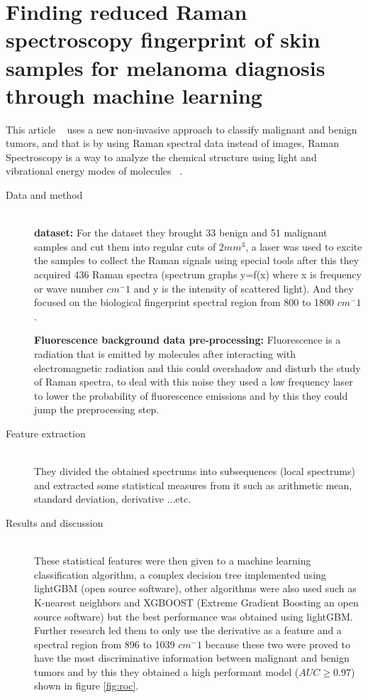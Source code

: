 
\section{Finding reduced Raman spectroscopy fingerprint of skin samples for melanoma diagnosis through machine learning}
    This article ~\cite{Daniella2021} uses a new non-invasive approach to classify malignant and benign tumors, and that is by using Raman spectral data instead of images, Raman Spectroscopy is a way to analyze the chemical structure using light and vibrational energy modes of molecules ~\cite{Edinburgh}.
\begin{description}
\item[Data and method] \hfill \\
    
    \textbf{dataset: }
    For the dataset they brought 33 benign and 51 malignant samples and cut them into regular cuts of $2mm^3$, a laser was used to excite the samples to collect the Raman signals using special tools after this they acquired 436 Raman spectra (spectrum graphs y=f(x) where x is frequency or wave number $cm^-1$ and y is the intensity of scattered light). And they focused on the biological fingerprint spectral region from 800 to 1800 $cm^-1$.

    \textbf{Fluorescence background data pre-processing: }
    Fluorescence is a radiation that is emitted by molecules after interacting with electromagnetic radiation and this could overshadow and disturb the study of Raman spectra, to deal with this noise they used a low frequency laser to lower the probability of fluorescence emissions and by this they could jump the preprocessing step.
\item[Feature extraction] \hfill \\
    They divided the obtained spectrums into subsequences (local spectrums) and extracted some statistical measures from it such as arithmetic mean, standard deviation, derivative ...etc.

\item[Results and discussion] \hfill \\
    These statistical features were then given to a machine learning classification algorithm, a complex decision tree implemented using lightGBM (open source software), other algorithms were also used such as K-nearest neighbors and XGBOOST (Extreme Gradient Boosting an open source software) but the best performance was obtained using lightGBM.
    Further research led them to only use the derivative as a feature and a spectral region from 896 to 1039 $cm^-1$ because these two were proved to have the most discriminative information between malignant and benign tumors and by this they obtained a high performant model ($AUC \geq 0.97$) shown in figure \ref{fig:roc}.
\end{description}

